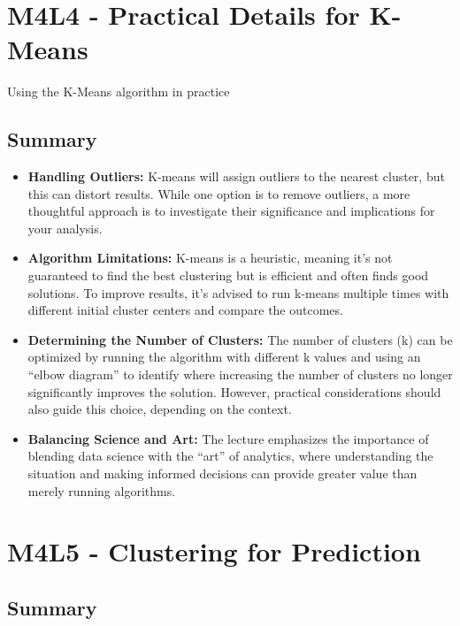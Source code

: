 \documentclass[
]{book}
\providecommand{\tightlist}{%
  \setlength{\itemsep}{0pt}\setlength{\parskip}{0pt}}
\begin{document}
\section{M4L4 - Practical Details for K-Means}\label{m4l4---practical-details-for-k-means}

Using the K-Means algorithm in practice

\subsection{Summary}\label{summary-3}

\begin{itemize}
\tightlist
\item
  \textbf{Handling Outliers:} K-means will assign outliers to the nearest cluster, but this can distort results. While one option is to remove outliers, a more thoughtful approach is to investigate their significance and implications for your analysis.
\item
  \textbf{Algorithm Limitations:} K-means is a heuristic, meaning it's not guaranteed to find the best clustering but is efficient and often finds good solutions. To improve results, it's advised to run k-means multiple times with different initial cluster centers and compare the outcomes.
\item
  \textbf{Determining the Number of Clusters:} The number of clusters (k) can be optimized by running the algorithm with different k values and using an ``elbow diagram'' to identify where increasing the number of clusters no longer significantly improves the solution. However, practical considerations should also guide this choice, depending on the context.
\item
  \textbf{Balancing Science and Art:} The lecture emphasizes the importance of blending data science with the ``art'' of analytics, where understanding the situation and making informed decisions can provide greater value than merely running algorithms.
\end{itemize}

\section{M4L5 - Clustering for Prediction}\label{m4l5---clustering-for-prediction}

\subsection{Summary}\label{summary-4}
\end{document}
